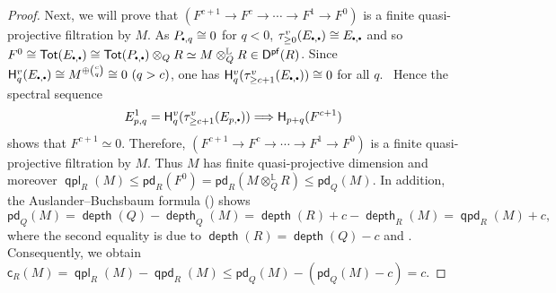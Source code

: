 \documentclass[10pt, a4paper,reqno]{amsart}
\theoremstyle{definition}
\theoremstyle{remark}
\numberwithin{equation}{thm}
\def\sH{\mathsf{H}}
\def\c{\mathsf{c}}
\def\depth{\operatorname{\mathsf{depth}}}
\def\Tor{\operatorname{\mathsf{Tor}}}
\def\Tot{\operatorname{\mathsf{Tot}}}
\def\Pf{\mathsf{D^{pf}}}
\def\ltensor{\otimes^{\mathbb{L}}}
\def\pd{\mathsf{pd}}
\def\qpd{\operatorname{\mathsf{qpd}}}
\def\qpl{\operatorname{\mathsf{qpl}}}
\newcommand{\mdot}{%
  \mathbin{\vcenter{\hbox{\scalebox{0.5}{$\bullet$}}}}%
}
\begin{document}
\begin{proof}
Next, we will prove that $(F^{c+1} \to F^c \to \cdots \to F^1 \to F^0)$ is a finite quasi-projective filtration by $M$.
As $P_{\mdot,q} \cong 0$ for $q < 0$, $\tau_{\ge 0}^v(E_{\mdot,\mdot}) \cong E_{\mdot,\mdot} $ and so $F^0 \cong \Tot(E_{\mdot,\mdot} ) \cong \Tot(P_{\mdot,\mdot}) \otimes_Q R \simeq M \ltensor_Q R \in \Pf(R)$.
Since
$\sH_q^v(E_{\mdot,\mdot})
\cong M^{\oplus\binom{c}{q}}
\cong 0
\,\, (q>c)$, 
one has
$\sH_q^v(\tau_{\ge c+1}^v(E_{\mdot,\mdot})) \cong 0$ for all $q$. 
Hence the spectral sequence
\[
E^1_{p,q}
=
\sH_q^v(\tau_{\ge c+1}^v(E_{p,\mdot}))
\Longrightarrow
\sH_{p+q}(F^{c+1})
\]
shows that $F^{c+1}\simeq0$.
Therefore, $(F^{c+1} \to F^c \to \cdots \to F^1 \to F^0)$ is a finite quasi-projective filtration by $M$.
Thus $M$ has finite quasi-projective dimension and moreover $\qpl_R(M) \le \pd_R(F^0) = \pd_R(M \ltensor_Q R)\le \pd_Q(M)$.
In addition, the Auslander--Buchsbaum formula () shows 
\[
\pd_Q(M) = \depth(Q) - \depth_Q(M) = \depth(R) + c - \depth_R(M) = \qpd_R(M) +c,
\]
where the second equality is due to $\depth(R) = \depth(Q) -c$ and \cite[Proposition 5.2(1)]{Iye}.
Consequently, we obtain $\c_R(M) = \qpl_R(M) - \qpd_R(M) \le \pd_Q(M) - (\pd_Q(M) - c) = c$.

\end{proof}
\end{document}
